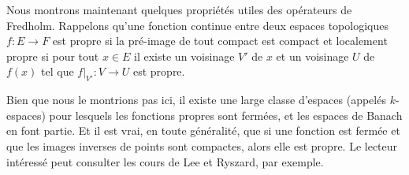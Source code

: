 \documentclass[memoire.tex]{subfiles}
\begin{document}
Nous montrons maintenant quelques propriétés utiles des opérateurs de Fredholm. 
 Rappelons qu'une fonction continue entre deux espaces topologiques $f:E\rightarrow F$ est \textcolor{color-def}{propre} si la pré-image de tout compact est compact et \textcolor{color-def}{ localement propre} si pour tout $x\in E$ il existe un voisinage $V'$ de $x$ et un voisinage $U$ de $f(x)$ tel que $f|_{V'}:V\rightarrow U$ est propre.
 \begin{remarque}
    Bien que nous le montrions pas ici, il existe une large  classe d'espaces (appelés $k$-espaces) pour lesquels les fonctions propres sont fermées, et les espaces de Banach en font partie. Et il est vrai, en toute généralité, que si une fonction est fermée et que les images inverses de points sont compactes, alors elle est propre. Le lecteur intéressé peut consulter les cours de Lee et Ryszard, par exemple. \cite{Lee2011TopologicalManifolds,Engelking1989GeneralTopology}
 \end{remarque}
\end{document}
